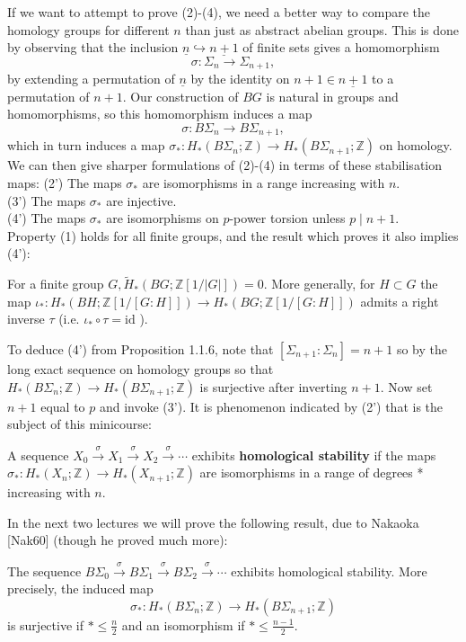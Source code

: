 If we want to attempt to prove (2)-(4), we need a better way to compare the homology groups for different $n$ than just as abstract abelian groups. This is done by observing that the inclusion $\underline{n} \hookrightarrow \underline{n+1}$ of finite sets gives a homomorphism
$$
\sigma: \Sigma_n \longrightarrow \Sigma_{n+1},
$$
by extending a permutation of $\underline{n}$ by the identity on $n+1 \in \underline{n+1}$ to a permutation of $n+1$. Our construction of $B G$ is natural in groups and homomorphisms, so this homomorphism induces a map
$$
\sigma: B \Sigma_n \longrightarrow B \Sigma_{n+1},
$$
which in turn induces a map $\sigma_*: H_*\left(B \Sigma_n ; \mathbb{Z}\right) \rightarrow H_*\left(B \Sigma_{n+1} ; \mathbb{Z}\right)$ on homology. We can then give sharper formulations of (2)-(4) in terms of these stabilisation maps:
(2') The maps $\sigma_*$ are isomorphisms in a range increasing with $n$.\\
(3') The maps $\sigma_*$ are injective.\\
(4') The maps $\sigma_*$ are isomorphisms on $p$-power torsion unless $p \mid n+1$.\\
Property (1) holds for all finite groups, and the result which proves it also implies (4'):

\begin{prop}
For a finite group $G, \widetilde{H}_*(B G ; \mathbb{Z}[1 /|G|])=0$. More generally, for $H \subset G$ the map $\iota_*: H_*(B H ; \mathbb{Z}[1 /[G: H]]) \rightarrow H_*(B G ; \mathbb{Z}[1 /[G: H]])$ admits a right inverse $\tau$ (i.e. $\iota_* \circ \tau=\mathrm{id}$ ).
\end{prop}

To deduce (4') from Proposition 1.1.6, note that $\left[\Sigma_{n+1}: \Sigma_n\right]=n+1$ so by the long exact sequence on homology groups so that $H_*\left(B \Sigma_n ; \mathbb{Z}\right) \rightarrow H_*\left(B \Sigma_{n+1} ; \mathbb{Z}\right)$ is surjective after inverting $n+1$. Now set $n+1$ equal to $p$ and invoke (3').
It is phenomenon indicated by (2') that is the subject of this minicourse:

A sequence $X_0 \xrightarrow{\sigma} X_1 \xrightarrow{\sigma} X_2 \xrightarrow{\sigma} \cdots$ exhibits \textbf{homological stability} if the maps $\sigma_*: H_*\left(X_n ; \mathbb{Z}\right) \rightarrow H_*\left(X_{n+1} ; \mathbb{Z}\right)$ are isomorphisms in a range of degrees * increasing with $n$.

In the next two lectures we will prove the following result, due to Nakaoka [Nak60] (though he proved much more):
\begin{theo}
The sequence $B \Sigma_0 \xrightarrow{\sigma} B \Sigma_1 \xrightarrow{\sigma} B \Sigma_2 \xrightarrow{\sigma} \cdots$ exhibits homological stability. More precisely, the induced map
    $$
    \sigma_*: H_*\left(B \Sigma_n ; \mathbb{Z}\right) \longrightarrow H_*\left(B \Sigma_{n+1} ; \mathbb{Z}\right)
    $$
    is surjective if $* \leq \frac{n}{2}$ and an isomorphism if $* \leq \frac{n-1}{2}$.
\end{theo}


